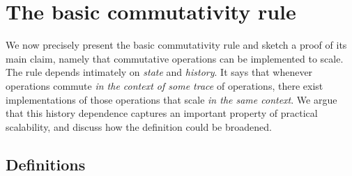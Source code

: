 
\section{The basic commutativity rule}
\label{sec:rule}

We now precisely present the basic commutativity rule and sketch a
proof of its main claim, namely that commutative operations can be
implemented to scale.
%
The rule depends intimately on \emph{state} and \emph{history}.
%
It says that whenever operations commute \emph{in the context of some
trace} of operations, there exist implementations of those operations
that scale \emph{in the same context}.
%
We argue that this history dependence captures an important property of
practical scalability, and discuss how the definition could be
broadened.

\begin{comment}
To give a sense for how the connection between commutativity and
scalability might be formalized, this section provides a preliminary
definition of scalability, commutativity, and a rule that connects the
two.  While this makes our proposal more concrete, we hope to further
improve on these definitions and rules to make them easier to apply
in practice.

In this section, we start by first defining an abstract machine designed
to capture the primary factors in scalability on real hardware.
Then, we define commutativity in a way
that applies well to system calls with state-dependent behavior.  Finally,
our hypothesis connects the commutativity of interfaces with the
existence of implementations that scale linearly on the abstract
machine.
\end{comment}

\subsection{Definitions}
\label{pf}

\def\OP#1{\textsl{#1}}
\def\INV#1#2#3{\text{\OP{#1}}_{#3}(#2)}
\def\RES#1#2#3{\text{\OP{#1}}_{#3} \rightarrow #2}
\def\HRESTRICT#1#2{#1|#2}
\def\HIST#1{#1}
\def\LEGALHIST{\mathcal{H}}
\def\PARTIALHIST{\mathcal{P}}
\def\STEP{\rightarrow}
\def\TRUE{\textsc{true}}
\def\FALSE{\textsc{false}}
\def\OK{\textsc{ok}}
\def\FAIL{\textsc{fail}}
\def\qed{$\square$}

\begin{comment}
The abstract machine gives us a way to reason about when a particular
implementation scales, which, in turn, lets us weigh potential
implementations of an given interface.
In order to reason about when an interface's implementation \emph{can
  be} scalable, this section turns to \emph{commutativity}, an interface
design property that captures the inherent communication needs of an
interface's implementations.
\end{comment}

